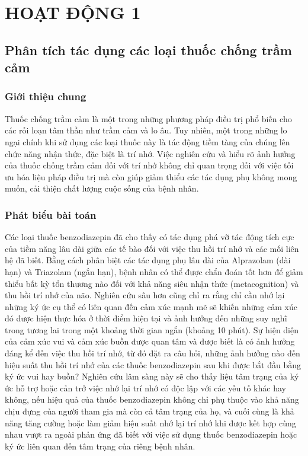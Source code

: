 \chapter{HOẠT ĐỘNG 1}
\section{Phân tích tác dụng các loại thuốc chống trầm cảm}
\subsection{Giới thiệu chung}
Thuốc chống trầm cảm là một trong những phương pháp điều trị phổ biến cho các rối loạn tâm thần như trầm cảm và lo âu. Tuy nhiên, một trong những lo ngại chính khi sử dụng các loại thuốc này là tác động tiềm tàng của chúng lên chức năng nhận thức, đặc biệt là trí nhớ. Việc nghiên cứu và hiểu rõ ảnh hưởng của thuốc chống trầm cảm đối với trí nhớ không chỉ quan trọng đối với việc tối ưu hóa liệu pháp điều trị mà còn giúp giảm thiểu các tác dụng phụ không mong muốn, cải thiện chất lượng cuộc sống của bệnh nhân.

\subsection{Phát biểu bài toán}
Các loại thuốc benzodiazepin đã cho thấy có tác dụng phá vỡ tác động tích cực của tiềm năng lâu dài giữa các tế bào đối với việc thu hồi trí nhớ và các mối liên hệ đã biết. Bằng cách phân biệt các tác dụng phụ lâu dài của Alprazolam (dài hạn) và Triazolam (ngắn hạn), bệnh nhân có thể được chẩn đoán tốt hơn để giảm thiểu bất kỳ tổn thương nào đối với khả năng siêu nhận thức (metacognition) và thu hồi trí nhớ của não. Nghiên cứu sâu hơn cũng chỉ ra rằng chỉ cần nhớ lại những ký ức cụ thể có liên quan đến cảm xúc mạnh mẽ sẽ khiến những cảm xúc đó được hiện thực hóa ở thời điểm hiện tại và ảnh hưởng đến những suy nghĩ trong tương lai trong một khoảng thời gian ngắn (khoảng 10 phút). Sự hiện diện của cảm xúc vui và cảm xúc buồn được quan tâm và được biết là có ảnh hưởng đáng kể đến việc thu hồi trí nhớ, từ đó đặt ra câu hỏi, những ảnh hưởng nào đến hiệu suất thu hồi trí nhớ của các thuốc benzodiazepin sau khi được bắt đầu bằng ký ức vui hay buồn? Nghiên cứu lâm sàng này sẽ cho thấy liệu tâm trạng của ký ức hỗ trợ hoặc cản trở việc nhớ lại trí nhớ có độc lập với các yếu tố khác hay không, nếu hiệu quả của thuốc benzodiazepin không chỉ phụ thuộc vào khả năng chịu đựng của người tham gia mà còn cả tâm trạng của họ, và cuối cùng là khả năng tăng cường hoặc làm giảm hiệu suất nhớ lại trí nhớ khi được kết hợp cùng nhau vượt ra ngoài phản ứng đã biết với việc sử dụng thuốc benzodiazepin hoặc ký ức liên quan đến tâm trạng của riêng bệnh nhân.

